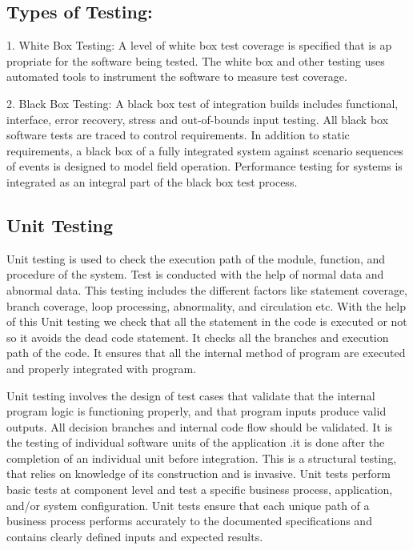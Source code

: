 \documentclass[12pt]{report}
\begin{document}
\subsection{ Types of Testing:
}
\justifying
\setlength{\parindent}{4em}
\setlength{\parskip}{0.5em}
\renewcommand{\baselinestretch}{1.5}
\normalsize

\hspace{1.7 cm} 1. White Box Testing: A level of white box test coverage is specified that is ap propriate for 
the software being tested. The white box and other testing uses automated tools to instrument 
the software to measure test coverage.

2. Black Box Testing: A black box test of integration builds includes functional, interface, 
error recovery, stress and out-of-bounds input testing. All black box software tests are traced 
to control requirements. In addition to static requirements, a black box of a fully integrated 
system against scenario sequences of events is designed to model field operation. 
Performance testing for systems is integrated as an integral part of the black box test process.


\subsection{ Unit Testing
}
\justifying
\setlength{\parindent}{4em}
\setlength{\parskip}{0.5em}
\renewcommand{\baselinestretch}{1.5}
\normalsize

Unit testing is used to check the execution path of the module, function, and procedure of 
the system. Test is conducted with the help of normal data and abnormal data. This testing 
includes the different factors like statement coverage, branch coverage, loop processing, 
abnormality, and circulation etc. With the help of this Unit testing we check that all the 
statement in the code is executed or not so it avoids the dead code statement. It checks all 
the branches and execution path of the code. It ensures that all the internal method of 
program are executed and properly integrated with program.

Unit testing involves the design of test cases that validate that the internal program logic is 
functioning properly, and that program inputs produce valid outputs. All decision branches 
and internal code flow should be validated. It is the testing of individual software units of 
the application .it is done after the completion of an individual unit before integration. This 
is a structural testing, that relies on knowledge of its construction and is invasive. Unit tests 
perform basic tests at component level and test a specific business process, application, 
and/or system configuration. Unit tests ensure that each unique path of a business process 
performs accurately to the documented specifications and contains clearly defined inputs 
and expected results.
\end{document}

